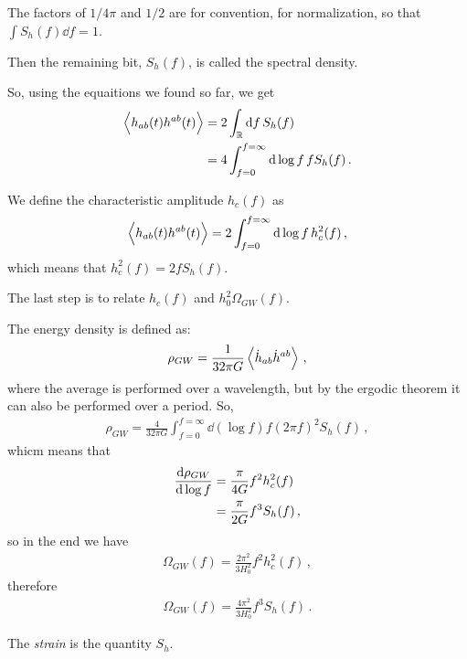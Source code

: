 \documentclass[main.tex]{subfiles}
\begin{document}
The factors of \(1 / 4 \pi \) and \(1 / 2\) are for convention, for normalization, so that \(\int S_{h} (f) \dd{f} = 1\). 

Then the remaining bit, \(S_{h}(f)\), is called the spectral density. 

So, using the equaitions we found so far, we get 
%
\begin{subequations}
\begin{align}
\expval{h_{ab}(t) h^{ab}(t)} &= 2 \int_{\mathbb{R}} \dd{f} S_h (f)  \\
&= 4 \int_{f=0}^{f= \infty } \dd{\log f} f S_h (f)
\,.
\end{align}
\end{subequations}

We define the characteristic amplitude \(h_{c}(f)\) as 
%
\begin{align}
\expval{h_{ab} (t) h^{ab } (t)} = 2 \int_{f=0}^{f = \infty} \dd{\log f} h_c^2 (f)
\,,
\end{align}
%
which means that \(h_c^2(f) = 2 f S_h(f)\). 

The last step is to relate \(h_c(f)\) and \(h_0^2 \Omega_{GW}(f)\). 

The energy density is defined as:
%
\begin{align}
\rho_{GW} =  \frac{1}{32 \pi G} \expval{\dot{h}_{ab} \dot{h}^{ab} }
\,,
\end{align}
%
where the average is performed over a wavelength, but by the ergodic theorem it can also be performed over a period.
So, 
%
\begin{align}
\rho_{GW} = \frac{4}{32 \pi G} \int_{f=0}^{f= \infty } \dd{(\log f)} f (2 \pi f)^2 S_h (f)
\,,
\end{align}
%
whicm means that 
%
\begin{subequations}
\begin{align}
\dv{\rho_{GW}}{\log f} &= \frac{\pi }{4 G} f^2 h_c^2(f)  \\
&= \frac{\pi}{2G} f^3 S_h (f)
\,,
\end{align}
\end{subequations}
%
so in the end we have 
%
\begin{align}
\Omega_{GW} (f) = \frac{2 \pi^2}{3 H_0^2} f^2 h_c^2 (f)
\,,
\end{align}
%
therefore 
%
\begin{align}
\Omega_{GW}(f) = \frac{4 \pi^2}{3 H_0^2} f^3 S_h (f)
\,.
\end{align}

The \emph{strain} is the quantity \(S_h\). 
\end{document}
